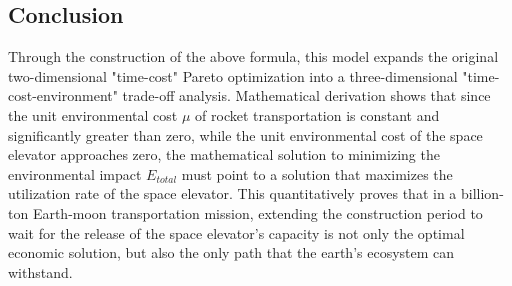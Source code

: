 \subsection{Conclusion}
Through the construction of the above formula, this model expands the original two-dimensional "time-cost" Pareto optimization into a three-dimensional "time-cost-environment" trade-off analysis.
Mathematical derivation shows that since the unit environmental cost $\mu $ of rocket transportation is constant and significantly greater than zero, while the unit environmental cost of the space elevator approaches zero, the mathematical solution to minimizing the environmental impact $E_{total}$ must point to a solution that maximizes the utilization rate of the space elevator.
This quantitatively proves that in a billion-ton Earth-moon transportation mission, extending the construction period to wait for the release of the space elevator's capacity is not only the optimal economic solution, but also the only path that the earth's ecosystem can withstand.